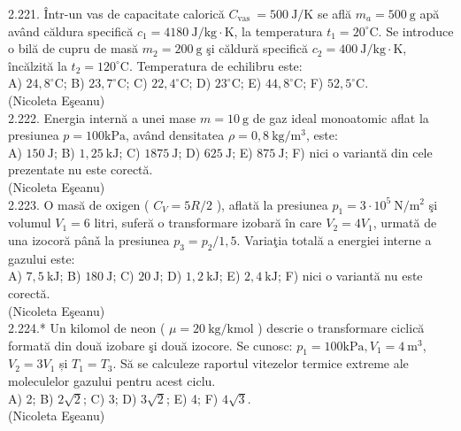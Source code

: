 2.221. Într-un vas de capacitate calorică $C_{\text {vas }}=500 \mathrm{~J} / \mathrm{K}$ se află $m_{a}=500 \mathrm{~g}$ apă având căldura specifică $c_{1}=4180 \mathrm{~J} / \mathrm{kg} \cdot \mathrm{K}$, la temperatura $t_{1}=20^{\circ} \mathrm{C}$. Se introduce o bilă de cupru de masă $m_{2}=200 \mathrm{~g}$ şi căldură specifică $c_{2}=400 \mathrm{~J} / \mathrm{kg} \cdot \mathrm{K}$, încălzită la $t_{2}=120^{\circ} \mathrm{C}$. Temperatura de echilibru este:\\ A) $24,8^{\circ} \mathrm{C}$; B) $23,7^{\circ} \mathrm{C}$; C) $22,4^{\circ} \mathrm{C}$; D) $23^{\circ} \mathrm{C}$; E) $44,8^{\circ} \mathrm{C}$; F) $52,5^{\circ} \mathrm{C}$.\\ (Nicoleta Eşeanu)\\

2.222. Energia internă a unei mase $m=10 \mathrm{~g}$ de gaz ideal monoatomic aflat la presiunea $p=100 \mathrm{kPa}$, având densitatea $\rho=0,8 \mathrm{~kg} / \mathrm{m}^{3}$, este:\\ A) $150 \mathrm{~J}$; B) $1,25 \mathrm{~kJ}$; C) $1875 \mathrm{~J}$; D) $625 \mathrm{~J}$; E) $875 \mathrm{~J}$; F) nici o variantă din cele prezentate nu este corectă.\\ (Nicoleta Eşeanu)\\

2.223. O masă de oxigen ( $C_{V}=5 R / 2$ ), aflată la presiunea $p_{1}=3 \cdot 10^{5} \mathrm{~N} / \mathrm{m}^{2}$ şi volumul $V_{1}=6$ litri, suferă o transformare izobară în care $V_{2}=4 V_{1}$, urmată de una izocoră pânǎ la presiunea $p_{3}=p_{2} / 1,5$. Variaţia totală a energiei interne a gazului este:\\ A) $7,5 \mathrm{~kJ}$; B) $180 \mathrm{~J}$; C) $20 \mathrm{~J}$; D) $1,2 \mathrm{~kJ}$; E) $2,4 \mathrm{~kJ}$; F) nici o variantă nu este corectă.\\ (Nicoleta Eşeanu)\\

2.224.* Un kilomol de neon ( $\mu=20 \mathrm{~kg} / \mathrm{kmol}$ ) descrie o transformare ciclică formată din două izobare şi două izocore. Se cunosc: $p_{1}=100 \mathrm{kPa}, V_{1}=4 \mathrm{~m}^{3}$, $V_{2}=3 V_{1}$ și $T_{1}=T_{3}$. Să se calculeze raportul vitezelor termice extreme ale moleculelor gazului pentru acest ciclu.\\ A) 2; B) $2 \sqrt{2}$; C) 3; D) $3 \sqrt{2}$; E) 4; F) $4 \sqrt{3}$.\\ (Nicoleta Eşeanu)\\

